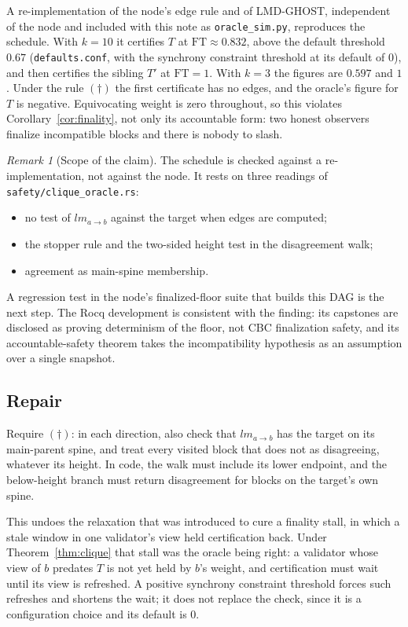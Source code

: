 \documentclass[11pt]{article}
\theoremstyle{definition}
\theoremstyle{remark}
\newtheorem{remark}[theorem]{Remark}
\begin{document}
A re-implementation of the node's edge rule and of LMD-GHOST, independent of
the node and included with this note as \texttt{oracle\_sim.py}, reproduces
the schedule. With $k=10$ it certifies $T$ at $\mathrm{FT}\approx0.832$, above
the default threshold $0.67$ (\texttt{defaults.conf}, with the synchrony
constraint threshold at its default of $0$), and then certifies the sibling
$T'$ at $\mathrm{FT}=1$. With $k=3$ the figures are $0.597$ and $1$. Under the
rule $(\dagger)$ the first certificate has no edges, and the oracle's figure for
$T$ is negative. Equivocating weight is zero throughout, so this violates
Corollary~\ref{cor:finality}, not only its accountable form: two honest
observers finalize incompatible blocks and there is nobody to slash.

\begin{remark}[Scope of the claim]
The schedule is checked against a re-implementation, not against the node.
It rests on three readings of \texttt{safety/clique\_oracle.rs}:
\begin{itemize}[leftmargin=1.5em]
\item no test of $\mathit{lm}_{a\to b}$ against the target when edges are
  computed;
\item the stopper rule and the two-sided height test in the disagreement walk;
\item agreement as main-spine membership.
\end{itemize} A regression test in the node's
finalized-floor suite that builds this DAG is the next step. The Rocq
development is consistent with the finding: its capstones are disclosed as
proving determinism of the floor, not CBC finalization safety, and its
accountable-safety theorem takes the incompatibility hypothesis as an
assumption over a single snapshot.
\end{remark}

\subsection{Repair}

Require $(\dagger)$: in each direction, also check that $\mathit{lm}_{a\to b}$
has the target on its main-parent spine, and treat every visited block that
does not as disagreeing, whatever its height. In code, the walk must include
its lower endpoint, and the below-height branch must return disagreement for
blocks on the target's own spine.

This undoes the relaxation that was introduced to cure a finality stall, in
which a stale window in one validator's view held certification back. Under
Theorem~\ref{thm:clique} that stall was the oracle being right: a validator
whose view of $b$ predates $T$ is not yet held by $b$'s weight, and
certification must wait until its view is refreshed. A positive synchrony
constraint threshold forces such refreshes and shortens the wait; it does not
replace the check, since it is a configuration choice and its default is $0$.
\end{document}
